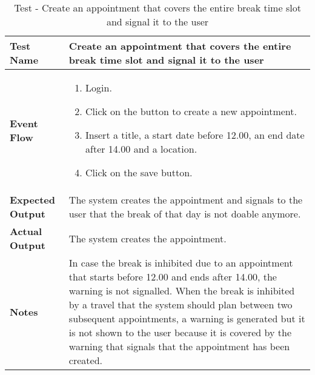 \begin{table}[h]	
	\centering
	\def\arraystretch{1.5}
	\begin{tabular}{|m{7cm}|m{7cm}|}
		\hline
		\textbf{Test Name}            & Create an appointment that covers the entire break time slot and signal it to the user\\ \hline
		\textbf{Event Flow}             & 
		\begin{enumerate}
			\item Login.
			\item Click on the button to create a new appointment.
			\item Insert a title, a start date before 12.00, an end date after 14.00 and a location.
			\item Click on the save button.
		\end{enumerate} \\ \hline
		\textbf{Expected Output}  &  The system creates the appointment and signals to the user that the break of that day is not doable anymore.  \\ \hline
		\textbf{Actual Output}       & The system creates the appointment.   \\ \hline
		\textbf{Notes} & In case the break is inhibited due to an appointment that starts before 12.00 and ends after 14.00, the warning is not signalled. When the break is inhibited by a travel that the system should plan between two subsequent appointments, a warning is generated but it is not shown to the user because it is covered by the warning that signals that the appointment has been created. \\ \hline
	\end{tabular}
	\caption{Test - Create an appointment that covers the entire break time slot and signal it to the user}
\end{table}


